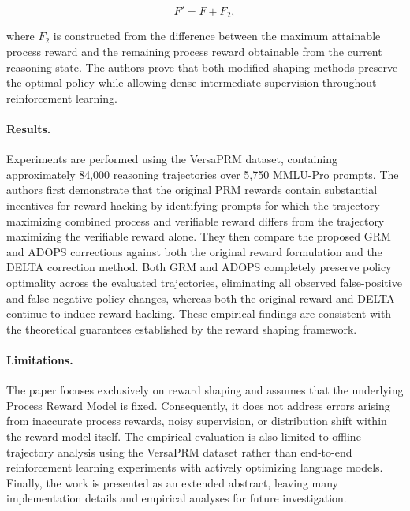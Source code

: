 \documentclass[11pt]{article}
\begin{document}
\[
F'
=
F
+
F_2,
\]

where \(F_2\) is constructed from the difference between the maximum attainable process reward and the remaining process reward obtainable from the current reasoning state. The authors prove that both modified shaping methods preserve the optimal policy while allowing dense intermediate supervision throughout reinforcement learning. 

\paragraph{Results.}
Experiments are performed using the VersaPRM dataset, containing approximately 84,000 reasoning trajectories over 5,750 MMLU-Pro prompts. The authors first demonstrate that the original PRM rewards contain substantial incentives for reward hacking by identifying prompts for which the trajectory maximizing combined process and verifiable reward differs from the trajectory maximizing the verifiable reward alone. They then compare the proposed GRM and ADOPS corrections against both the original reward formulation and the DELTA correction method. Both GRM and ADOPS completely preserve policy optimality across the evaluated trajectories, eliminating all observed false-positive and false-negative policy changes, whereas both the original reward and DELTA continue to induce reward hacking. These empirical findings are consistent with the theoretical guarantees established by the reward shaping framework. 

\paragraph{Limitations.}
The paper focuses exclusively on reward shaping and assumes that the underlying Process Reward Model is fixed. Consequently, it does not address errors arising from inaccurate process rewards, noisy supervision, or distribution shift within the reward model itself. The empirical evaluation is also limited to offline trajectory analysis using the VersaPRM dataset rather than end-to-end reinforcement learning experiments with actively optimizing language models. Finally, the work is presented as an extended abstract, leaving many implementation details and empirical analyses for future investigation. 
\end{document}
